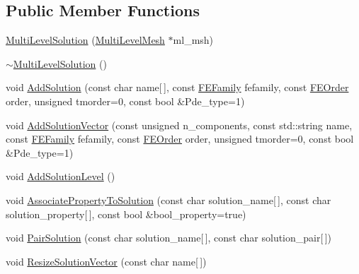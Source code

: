 \subsection*{Public Member Functions}
\begin{DoxyCompactItemize}
\item 
\mbox{\hyperlink{classfemus_1_1_multi_level_solution_a1eb7aedad8ef351fdce884425b7a6928}{Multi\+Level\+Solution}} (\mbox{\hyperlink{classfemus_1_1_multi_level_mesh}{Multi\+Level\+Mesh}} $\ast$ml\+\_\+msh)
\item 
\mbox{\hyperlink{classfemus_1_1_multi_level_solution_a3be34a688b8951bfaa32dc70dd227750}{$\sim$\+Multi\+Level\+Solution}} ()
\item 
void \mbox{\hyperlink{classfemus_1_1_multi_level_solution_ac5f9a3671e02bbf2fb7a893ddee30f8b}{Add\+Solution}} (const char name\mbox{[}$\,$\mbox{]}, const \mbox{\hyperlink{_f_elem_type_enum_8hpp_a7c9a70b7c6b5baf5d7942938d770a664}{F\+E\+Family}} fefamily, const \mbox{\hyperlink{_f_elem_type_enum_8hpp_a00ea9562f0dbb25e22bb3297d596e3ba}{F\+E\+Order}} order, unsigned tmorder=0, const bool \&Pde\+\_\+type=1)
\item 
void \mbox{\hyperlink{classfemus_1_1_multi_level_solution_ad5ac49720e6ce6c853356d87094db343}{Add\+Solution\+Vector}} (const unsigned n\+\_\+components, const std\+::string name, const \mbox{\hyperlink{_f_elem_type_enum_8hpp_a7c9a70b7c6b5baf5d7942938d770a664}{F\+E\+Family}} fefamily, const \mbox{\hyperlink{_f_elem_type_enum_8hpp_a00ea9562f0dbb25e22bb3297d596e3ba}{F\+E\+Order}} order, unsigned tmorder=0, const bool \&Pde\+\_\+type=1)
\item 
void \mbox{\hyperlink{classfemus_1_1_multi_level_solution_a23d19b085a62b184c9aee94923a04067}{Add\+Solution\+Level}} ()
\item 
void \mbox{\hyperlink{classfemus_1_1_multi_level_solution_ab34c5b431e194c7748227e3a68bd9a40}{Associate\+Property\+To\+Solution}} (const char solution\+\_\+name\mbox{[}$\,$\mbox{]}, const char solution\+\_\+property\mbox{[}$\,$\mbox{]}, const bool \&bool\+\_\+property=true)
\item 
void \mbox{\hyperlink{classfemus_1_1_multi_level_solution_a694ed0e50a403626904f1a48f8860711}{Pair\+Solution}} (const char solution\+\_\+name\mbox{[}$\,$\mbox{]}, const char solution\+\_\+pair\mbox{[}$\,$\mbox{]})
\item 
void \mbox{\hyperlink{classfemus_1_1_multi_level_solution_a26dc48260560a41a45bdf2914aa5aad3}{Resize\+Solution\+Vector}} (const char name\mbox{[}$\,$\mbox{]})
\item 

\end{DoxyCompactItemize}
